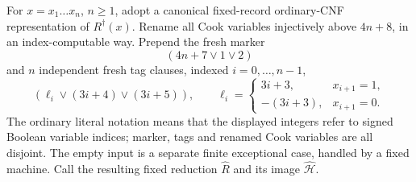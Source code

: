 \documentclass[11pt]{article}
\begin{document}
For $x=x_1\ldots x_n$, $n\ge1$, adopt a canonical fixed-record
ordinary-CNF representation of $R^\dagger(x)$.
Rename all Cook variables injectively above $4n+8$, in an
index-computable way. Prepend the fresh marker
\[
  (4n+7\vee 1\vee 2)
\]
and $n$ independent fresh tag clauses, indexed $i=0,\ldots,n-1$,
\[
 (\ell_i\vee (3i+4)\vee (3i+5)),\qquad
 \ell_i=\begin{cases}
 3i+3,&x_{i+1}=1,\\ -(3i+3),&x_{i+1}=0.
 \end{cases}
\]
The ordinary literal notation means that the displayed integers
refer to signed Boolean variable indices; marker, tags and renamed
Cook variables are all disjoint. The empty input is a
separate finite exceptional case, handled by a fixed machine.
Call the resulting fixed reduction $\widehat R$ and its
image $\widehat{\mathcal H}$.
\end{document}
